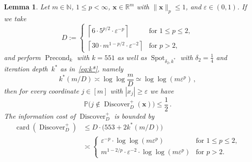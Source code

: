 \documentclass[12pt]{article}
\theoremstyle{plain}
\newtheorem{lemma}[theorem]{Lemma}
\theoremstyle{definition}
\renewcommand{\P}{{\mathbb P}}
\DeclareMathOperator{\card}{card}
\newcommand{\eps}{\varepsilon}
\renewcommand{\vec}{\boldsymbol}
\newcommand{\R}{{\mathbb R}}
\newcommand{\N}{{\mathbb N}}
\DeclareMathOperator{\precond}{Precond}
\DeclareMathOperator{\spot}{Spot}
\DeclareMathOperator{\discover}{Discover} %
\begin{document}
\begin{lemma} \label{lem:discover+}
    Let $m \in \N$, $1 \leq p < \infty$, $\vec{x} \in \R^m$ with $\|\vec{x}\|_p \leq 1$, and $\eps \in (0,1)$.
    If we take
    \begin{equation*}
        D := \begin{cases}
                \left\lceil 6 \cdot 5^{p/2} \cdot \eps^{-p} \right\rceil
                    &\text{for } 1 \leq p \leq 2,\\
                \left\lceil 30 \cdot m^{1 - p/2} \cdot \eps^{-2} \right\rceil
                    &\text{for } p > 2,
            \end{cases}
    \end{equation*}
    and perform $\precond_k$ with $k=551$
    as well as $\spot_{\delta_2,k^\ast}$ with $\delta_2 = \frac{1}{4}$
    and iteration depth~$k^\ast$ as in~\eqref{eq:k*}, namely
    \begin{equation*}
        k^\ast(m/D) \asymp \log \log \frac{m}{D} \simeq \log \log (m \eps^p) \,,
    \end{equation*}
    then for every 
    coordinate $j \in [m]$ with $|x_j| \geq \eps$ we have
    \begin{equation*}
        \P\bigl(j \notin \discover_D^+(\vec{x})\bigr) \leq \frac{1}{2} \,.
    \end{equation*}
    The information cost of $\discover_D^+$ is bounded by
    \begin{align*}
        \card(\discover^+_D)
            &\leq D \cdot \bigl(553 + 2k^\ast(m/D)\bigr) \\
            &\asymp \begin{cases}
                        \eps^{-p} \cdot \log \log (m \eps^p)
                            &\text{for } 1 \leq p \leq 2,\\
                        m^{1-2/p} \cdot \eps^{-2} \cdot \log \log (m \eps^p)
                            &\text{for } p > 2.
                    \end{cases}
    \end{align*}
\end{lemma}
\end{document}
